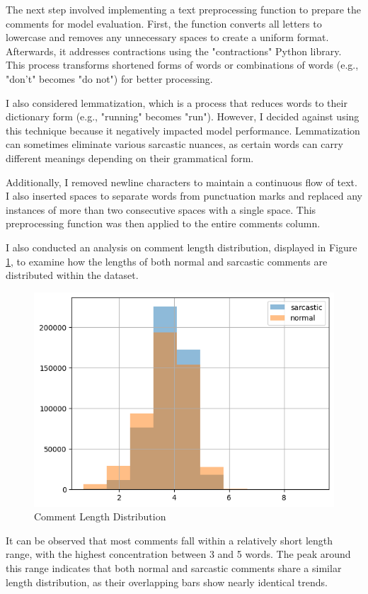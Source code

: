 The next step involved implementing a text preprocessing function to prepare the comments for model evaluation. First, the function converts all letters to lowercase and removes any unnecessary spaces to create a uniform format. 
Afterwards, it addresses contractions using the "contractions" Python library. This process transforms shortened forms of words or combinations of words (e.g., "don't" becomes "do not") 
for better processing.

I also considered lemmatization, which is a process that reduces words to their dictionary form (e.g., "running" becomes "run"). However, I decided against using this technique because 
it negatively impacted model performance. Lemmatization can sometimes eliminate various sarcastic nuances, as certain words can carry different meanings depending on their grammatical form.

Additionally, I removed newline characters to maintain a continuous flow of text. I also inserted spaces to separate words from punctuation marks and replaced any instances of more than 
two consecutive spaces with a single space. This preprocessing function was then applied to the entire comments column.

I also conducted an analysis on comment length distribution, displayed in Figure \ref{Fig_2}, to examine how the lengths of both normal and sarcastic comments are distributed within the 
dataset.

\begin{figure}
    \centering
    \includegraphics[width=0.5\linewidth]{img/length-dist.png}
    \caption{Comment Length Distribution}
    \label{Fig_2}
\end{figure}

It can be observed that most comments fall within a relatively short length range, with the highest concentration between 3 and 5 words. The peak around this range indicates that both 
normal and sarcastic comments share a similar length distribution, as their overlapping bars show nearly identical trends.

